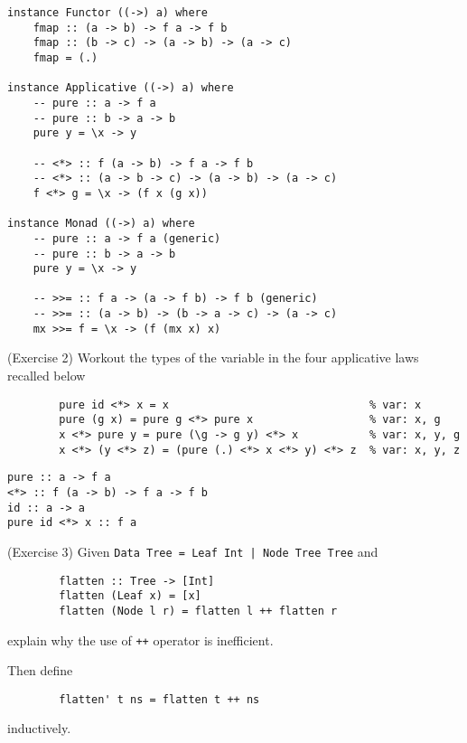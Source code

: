 \documentclass[12pt,a4paper,oneside]{book}
\begin{document}
\begin{verbatim}
instance Functor ((->) a) where
    fmap :: (a -> b) -> f a -> f b
    fmap :: (b -> c) -> (a -> b) -> (a -> c)
    fmap = (.)

instance Applicative ((->) a) where
    -- pure :: a -> f a
    -- pure :: b -> a -> b
    pure y = \x -> y

    -- <*> :: f (a -> b) -> f a -> f b
    -- <*> :: (a -> b -> c) -> (a -> b) -> (a -> c)
    f <*> g = \x -> (f x (g x))

instance Monad ((->) a) where
    -- pure :: a -> f a (generic)
    -- pure :: b -> a -> b
    pure y = \x -> y

    -- >>= :: f a -> (a -> f b) -> f b (generic)
    -- >>= :: (a -> b) -> (b -> a -> c) -> (a -> c)
    mx >>= f = \x -> (f (mx x) x)
\end{verbatim}

\begin{exercise}{(Exercise 2)}
	Workout the types of the variable in the four applicative laws recalled below
	\begin{verbatim}
		pure id <*> x = x                               % var: x
		pure (g x) = pure g <*> pure x                  % var: x, g
		x <*> pure y = pure (\g -> g y) <*> x           % var: x, y, g
		x <*> (y <*> z) = (pure (.) <*> x <*> y) <*> z  % var: x, y, z
	\end{verbatim}
\end{exercise}

\begin{verbatim}
pure :: a -> f a
<*> :: f (a -> b) -> f a -> f b
id :: a -> a
pure id <*> x :: f a
\end{verbatim}

\begin{exercise}{(Exercise 3)}
	Given \texttt{Data Tree = Leaf Int | Node Tree Tree} and 
	\begin{verbatim}
		flatten :: Tree -> [Int]
		flatten (Leaf x) = [x]
		flatten (Node l r) = flatten l ++ flatten r
	\end{verbatim}
	explain why the use of \texttt{++} operator is inefficient.
	
	Then define \begin{verbatim}
		flatten' t ns = flatten t ++ ns
	\end{verbatim} 
	inductively.  
\end{exercise}
\end{document}
